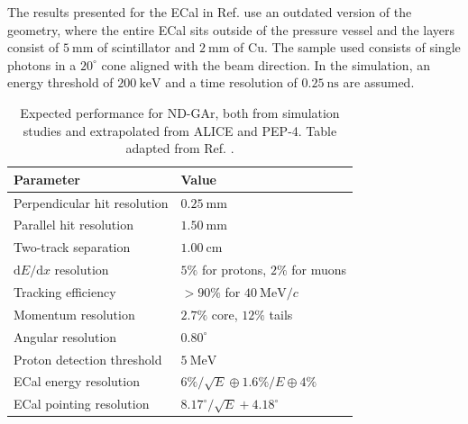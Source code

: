 The results presented for the ECal in Ref. \cite{DUNE2021NDCDR} use an outdated version of the geometry, where the entire ECal sits outside of the pressure vessel and the layers consist of $5~\mathrm{mm}$ of scintillator and $2~\mathrm{mm}$ of Cu. The sample used consists of single photons in a $20^{\circ}$ cone aligned with the beam direction. In the simulation, an energy threshold of $200~\mathrm{keV}$ and a time resolution of $0.25~\mathrm{ns}$ are assumed.

\begin{table}[t]
	\caption[Expected performance for ND-GAr, both from simulation studies and extrapolated from ALICE and PEP-4.]{Expected performance for ND-GAr, both from simulation studies and extrapolated from ALICE and PEP-4. Table adapted from Ref. \cite{DUNE2021NDCDR}.}
	\begin{center}
		\begin{small}
            \begin{tabular}{l|l}
                Parameter                            & Value                                        \\[2mm] \hline
                \rule{0pt}{1.1\normalbaselineskip}Perpendicular hit resolution         & $0.25~\mathrm{mm}$                           \\[2mm] 
                Parallel hit resolution              & $1.50~\mathrm{mm}$                           \\[2mm] 
                Two-track separation                 & $1.00~\mathrm{cm}$                           \\[2mm] 
                $\mathrm{d}E/\mathrm{d}x$ resolution & $5\%$ for protons, $2\%$ for muons           \\[2mm] 
                Tracking efficiency                  & $>90\%$ for $40 ~ \mathrm{MeV}/c$            \\[2mm] 
                Momentum resolution                  & $2.7\%$ core, $12\%$ tails                   \\[2mm] 
                Angular resolution                   & $0.80^{\circ}$                               \\[2mm] 
                Proton detection threshold           & $5 ~ \mathrm{MeV}$                           \\[2mm] 
                ECal energy resolution               & $6\% / \sqrt{E} \oplus 1.6\% / E \oplus 4\%$ \\[2mm] 
                ECal pointing resolution             & $8.17^{\circ} / \sqrt{E} + 4.18^{\circ}$    
            \end{tabular}
		\end{small}
	\end{center}
	\label{tab:detector_systs}
\end{table}


